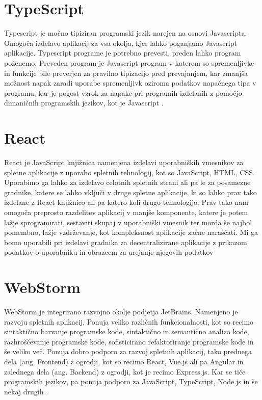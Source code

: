 \documentclass[a4paper,12pt,openright]{book}
\begin{document}
\section{TypeScript}
Typescript je močno tipiziran programski jezik narejen na osnovi Javascripta. 
Omogoča izdelavo aplikacij za vsa okolja, kjer lahko poganjamo Javascript aplikacije.
Typescript programe je potrebno prevesti, preden lahko program poženemo.
Preveden program je Javascript program v katerem so spremenljivke in funkcije bile preverjen za pravilno tipizacijo 
pred prevajanjem, kar zmanjša možnost napak zaradi uporabe spremenljivk oziroma podatkov napačnega tipa v programu, 
kar je pogost vzrok za napake pri programih izdelanih z pomočjo dimaničnih programskih jezikov, kot je Javascript \cite{typescript_homepage}.

\section{React}
React je JavaScript knjižnica namenjena izdelavi uporabniških vmesnikov za spletne aplikacije z uporabo spletnih tehnologij, kot so JavaScript, HTML, CSS.
Uporabimo ga lahko za izdelavo celotnih spletnih strani ali pa le za posamezne gradnike, katere se lahko vključi v 
druge spletne aplikacije, ki so lahko prav tako izdelane z React knjižnico ali pa katero koli drugo tehnologijo.
Prav tako nam omogoča preprosto razdelitev aplikacij v manjše komponente, katere je potem lažje sprogramirati, sestaviti skupaj v uporabniški vmesnik
ter morda še najbol pomembno, lažje vzdrževanje, kot kompleksnost aplikacije začne naraščati.
Mi ga bomo uporabili pri izdelavi gradnika za decentralizirane aplikacije z prikazom podatkov o uporabniku in obrazcem za urejanje njegovih podatkov \cite{react_homepage}


\section{WebStorm}
WebStorm je integrirano razvojno okolje podjetja JetBrains.
Namenjeno je razvoju spletnih aplikacij. 
Ponuja veliko različnih funkcionalnosti, kot so recimo sintaktično barvanje programske kode, sintaktično in semantično
analizo kode, razhroščevanje programske kode, sofisticirano refaktoriranje programske kode in še veliko več.
Ponuja dobro podporo za razvoj spletnih aplikacij, tako prednega dela (ang. Frontend) z ogrodji, kot so recimo React, Vue.js ali pa Angular
in zalednega dela (ang. Backend) z ogrodji, kot je recimo Express.js.
Kar se tiče programskih jezikov, pa ponuja podporo za JavaScript, TypeScript, Node.js in še nekaj drugih \cite{jetbrains_webstorm}.
\end{document}
